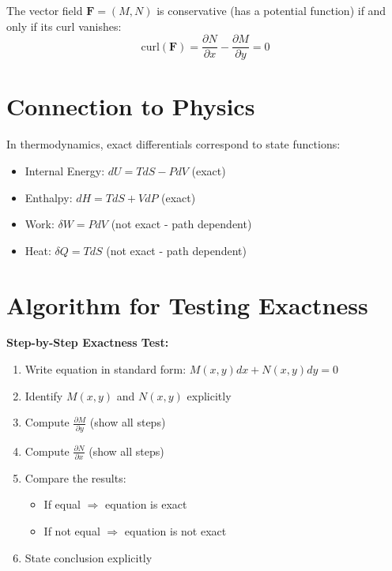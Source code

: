 \documentclass[12pt]{article}
\begin{document}
\begin{insight}
The vector field $\mathbf{F} = (M, N)$ is conservative (has a potential function) if and only if its curl vanishes:
\[\text{curl}(\mathbf{F}) = \frac{\partial N}{\partial x} - \frac{\partial M}{\partial y} = 0\]
\end{insight}

\section{Connection to Physics}

\begin{keypoint}
In thermodynamics, exact differentials correspond to state functions:
\begin{itemize}
    \item Internal Energy: $dU = TdS - PdV$ (exact)
    \item Enthalpy: $dH = TdS + VdP$ (exact)
    \item Work: $\delta W = PdV$ (not exact - path dependent)
    \item Heat: $\delta Q = TdS$ (not exact - path dependent)
\end{itemize}
\end{keypoint}

\section{Algorithm for Testing Exactness}

\begin{algorithm}
\textbf{Step-by-Step Exactness Test:}
\begin{enumerate}
    \item Write equation in standard form: $M(x,y)dx + N(x,y)dy = 0$
    \item Identify $M(x,y)$ and $N(x,y)$ explicitly
    \item Compute $\frac{\partial M}{\partial y}$ (show all steps)
    \item Compute $\frac{\partial N}{\partial x}$ (show all steps)
    \item Compare the results:
    \begin{itemize}
        \item If equal $\Rightarrow$ equation is exact
        \item If not equal $\Rightarrow$ equation is not exact
    \end{itemize}
    \item State conclusion explicitly
\end{enumerate}
\end{algorithm}
\end{document}
